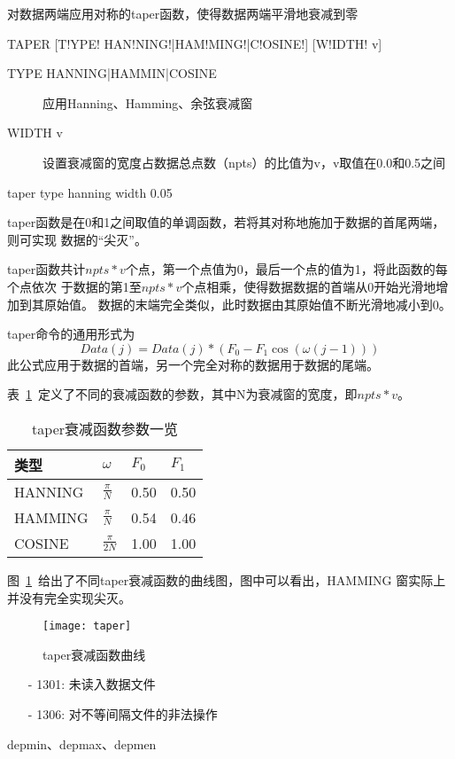 \label{cmd:taper}

对数据两端应用对称的taper函数，使得数据两端平滑地衰减到零

\begin{SACSTX}
TAPER [T!YPE! HAN!NING!|HAM!MING!|C!OSINE!] [W!IDTH! v]
\end{SACSTX}

\begin{description}
\item [TYPE HANNING|HAMMIN|COSINE] 应用Hanning、Hamming、余弦衰减窗
\item [WIDTH v] 设置衰减窗的宽度占数据总点数（npts）的比值为v，v取值在0.0和0.5之间
\end{description}

\begin{SACDFT}
taper type hanning width 0.05
\end{SACDFT}

taper函数是在0和1之间取值的单调函数，若将其对称地施加于数据的首尾两端，则可实现
数据的``尖灭''。

taper函数共计$npts*v$个点，第一个点值为0，最后一个点的值为1，将此函数的每个点依次
于数据的第1至$npts*v$个点相乘，使得数据数据的首端从0开始光滑地增加到其原始值。
数据的末端完全类似，此时数据由其原始值不断光滑地减小到0。

taper命令的通用形式为
\[
    Data(j) = Data(j)*(F_0 - F_1\cos(\omega(j-1)))
\]
此公式应用于数据的首端，另一个完全对称的数据用于数据的尾端。

表~\ref{table:taper-functions}~定义了不同的衰减函数的参数，其中N为衰减窗的宽度，即$npts*v$。
\begin{table}[ht]
\centering
\caption{taper衰减函数参数一览}
\label{table:taper-functions}
\begin{tabular}{llll}
\toprule
类型 & $\omega$ & $F_0$	& $F_1$	\\
\midrule
HANNING	&	$\frac{\pi}{N}$	&	0.50	&	0.50	\\
HAMMING	&	$\frac{\pi}{N}$	&	0.54	&	0.46	\\
COSINE	&	$\frac{\pi}{2N}$	&	1.00	&	1.00	\\
\bottomrule
\end{tabular}
\end{table}

图~\ref{fig:taper-functions}~给出了不同taper衰减函数的曲线图，图中可以看出，HAMMING
窗实际上并没有完全实现尖灭。
\begin{figure}[!ht]
\centering
\texttt{[image: taper]}
\caption{taper衰减函数曲线}
\label{fig:taper-functions}
\end{figure}

\begin{itemize}
\item[-]1301: 未读入数据文件
\item[-]1306: 对不等间隔文件的非法操作
\end{itemize}

depmin、depmax、depmen
